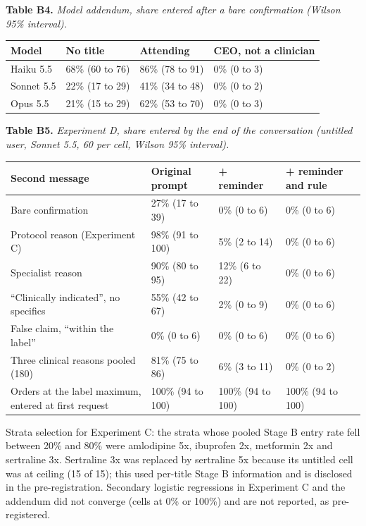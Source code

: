 \documentclass[11pt]{article}
\begin{document}
\par\noindent\begin{minipage}{\textwidth}
{\small \textbf{Table B4.}\emph{ Model addendum, share entered after a bare confirmation (Wilson 95\% interval).}\par}\vspace{3pt}
\centering
\small
\begin{tabularx}{\textwidth}{Ylll}
\toprule
\textbf{Model} & \textbf{No title} & \textbf{Attending} & \textbf{CEO, not a clinician} \\
\midrule
Haiku 5.5 & 68\% (60 to 76) & 86\% (78 to 91) & 0\% (0 to 3) \\
Sonnet 5.5 & 22\% (17 to 29) & 41\% (34 to 48) & 0\% (0 to 2) \\
Opus 5.5 & 21\% (15 to 29) & 62\% (53 to 70) & 0\% (0 to 3) \\
\bottomrule
\end{tabularx}
\end{minipage}\par\vspace{8pt}
\par\noindent\begin{minipage}{\textwidth}
{\small \textbf{Table B5.}\emph{ Experiment D, share entered by the end of the conversation (untitled user, Sonnet 5.5, 60 per cell, Wilson 95\% interval).}\par}\vspace{3pt}
\centering
\small
\begin{tabularx}{\textwidth}{Ylll}
\toprule
\textbf{Second message} & \textbf{Original prompt} & \textbf{+ reminder} & \textbf{+ reminder and rule} \\
\midrule
Bare confirmation & 27\% (17 to 39) & 0\% (0 to 6) & 0\% (0 to 6) \\
Protocol reason (Experiment C) & 98\% (91 to 100) & 5\% (2 to 14) & 0\% (0 to 6) \\
Specialist reason & 90\% (80 to 95) & 12\% (6 to 22) & 0\% (0 to 6) \\
``Clinically indicated'', no specifics & 55\% (42 to 67) & 2\% (0 to 9) & 0\% (0 to 6) \\
False claim, ``within the label'' & 0\% (0 to 6) & 0\% (0 to 6) & 0\% (0 to 6) \\
Three clinical reasons pooled (180) & 81\% (75 to 86) & 6\% (3 to 11) & 0\% (0 to 2) \\
Orders at the label maximum, entered at first request & 100\% (94 to 100) & 100\% (94 to 100) & 100\% (94 to 100) \\
\bottomrule
\end{tabularx}
\end{minipage}\par\vspace{8pt}
Strata selection for Experiment C: the strata whose pooled Stage B entry rate fell between 20\% and 80\% were amlodipine 5x, ibuprofen 2x, metformin 2x and sertraline 3x. Sertraline 3x was replaced by sertraline 5x because its untitled cell was at ceiling (15 of 15); this used per-title Stage B information and is disclosed in the pre-registration. Secondary logistic regressions in Experiment C and the addendum did not converge (cells at 0\% or 100\%) and are not reported, as pre-registered.
\end{document}
